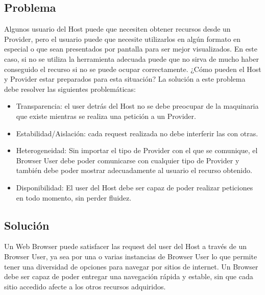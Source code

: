 \subsection{Problema}
Algunos usuario del Host puede que necesiten obtener recursos desde un Provider, pero el usuario puede que necesite utilizarlos en algún formato en especial o que sean presentados por pantalla para ser mejor visualizados. En este caso, si no se utiliza la herramienta adecuada puede que no sirva de mucho haber conseguido el recurso si no se puede ocupar correctamente. ¿Cómo pueden el Host y Provider estar preparados para esta situación?
La solución a este problema debe resolver las siguientes problemáticas:
\begin{itemize}
	\item Transparencia: el user detrás del Host no se debe preocupar de la maquinaria que existe mientras se realiza una petición a un Provider.
	\item Estabilidad/Aislación: cada request realizada no debe interferir las con otras.
	\item Heterogeneidad: Sin importar el tipo de Provider con el que se comunique, el Browser User debe poder comunicarse con cualquier tipo de Provider y también debe poder mostrar adecuadamente al usuario el recurso obtenido.
	\item Disponibilidad: El user del Host debe ser capaz de poder realizar peticiones en todo momento, sin perder fluidez.
\end{itemize}

\subsection{Solución}
Un Web Browser puede satisfacer las request del user del Host a través de un Browser User, ya sea por una o varias instancias de Browser User lo que permite tener una diversidad de opciones para navegar por sitios de internet. Un Browser debe ser capaz de poder entregar una navegación rápida y estable, sin que cada sitio accedido afecte a los otros recursos adquiridos.
